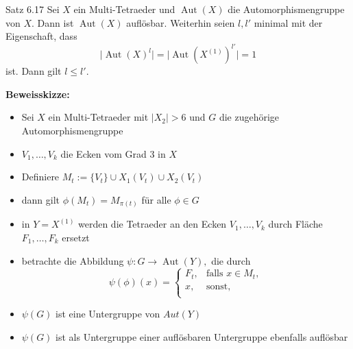 \documentclass{beamer}
\DeclareMathOperator{\Aut}{Aut}
\begin{document}
\begin{frame}
\begin{block}{Satz 6.17}
Sei $X$ ein Multi-Tetraeder und $\Aut(X)$ die Automorphismengruppe von $X$. Dann ist $\Aut(X)$ auflösbar.
Weiterhin seien $l,l'$ minimal mit der Eigenschaft, dass
\[
\vert \Aut(X)^l\vert=\vert \Aut(X^{(1)})^{l'}\vert =1
\] ist. Dann gilt $l\leq l'$.
\end{block}
\end{frame}
\begin{frame}
\textbf{Beweisskizze:}
\begin{itemize}
\item Sei $X$ ein Multi-Tetraeder mit $\vert X_2\vert >6$ und $G$ die zugehörige Automorphismengruppe\pause
\item $V_1,\ldots,V_k$ die Ecken vom Grad 3 in $X$\pause 
\item Definiere $M_t:=\{V_t\} \cup X_1(V_t) \cup X_2(V_t)$\pause
\item dann gilt $\phi(M_t)=M_{\pi(t)}$ für alle $\phi \in G$\pause
\item in $Y=X^{(1)}$ werden die Tetraeder an den Ecken $V_1,\ldots,V_k$ durch Fläche $F_1,\ldots,F_k$ ersetzt
\end{itemize}
\end{frame}
\begin{frame}
\begin{itemize}
\item betrachte die Abbildung $\psi:G\to \Aut(Y),$ die durch  
\[
\psi(\phi)(x)=
\begin{cases}
F_t,&\text{falls } x\in M_t, \\
x,& \text{sonst},\\
\end{cases}
\]\pause
\item $\psi(G)$ ist eine Untergruppe von $Aut(Y)$\pause
\item $\psi(G)$ ist als Untergruppe einer auflösbaren Untergruppe ebenfalls auflösbar
\end{itemize}
\end{frame}
\end{document}
